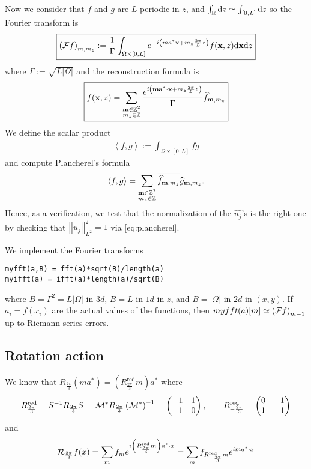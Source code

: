 \documentclass[11pt,a4paper,reqno,french,tikz]{amsart}
\def\d{{\rm d}}
\newcommand{\pa}[1]{\left( #1 \right)} %
\newcommand{\ab}[1]{\left|#1\right|} %
\newcommand{\ps}[1]{\left< #1 \right>} %
\newcommand{\nor}[2]{ \left| \! \left| #1 \right| \! \right|_{#2} } %
\newcommand{\f}[2]{\frac{#1}{#2}} %
\newcommand{\mat}[1]{\begin{pmatrix} #1 \end{pmatrix}} %
\def\ba{{\mathbf a}}
\def\bx{{\mathbf x}}
\def\bmm{{\mathbf m}}
\begin{document}
Now we consider that $f$ and $g$ are $L$-periodic in $z$, and $\int_\R \d z \simeq \int_{[0,L]} \d z$ so the Fourier transform is
\begin{align*}
	\boxed{\pa{\cF f}_{m,m_z} := \f{1}{\Gamma} \int_{\Omega\times [0,L]} e^{-i\pa{ma^* \bx + m_z \f{2\pi}{L} z}} f(\bx,z) \d \bx \d z}
\end{align*}
where $\Gamma := \sqrt{L\ab{\Omega}}$
and the reconstruction formula is
\begin{align}\label{eq:dec_four}
\boxed{f(\bx,z) =  \sum_{\substack{\bmm \in \Z^2 \\ m_z \in \Z}}  \f{e^{i\pa{\bmm \ba^* \cdot \bx + m_z \f{2\pi}L z}}}{\Gamma} \widehat{f}_{\bmm,m_z}}
\end{align}
We define the scalar product
\begin{align*}
\ps{f,g} := \int_{\Omega\times [0,L]} \overline{f}g
\end{align*}
and compute Plancherel's formula
\begin{align}\label{eq:plancherel}
\ps{f,g} = \sum_{\substack{\bmm \in \Z^2 \\ m_z \in \Z}} \overline{\widehat{f}_{\bmm,m_z}} \widehat{g}_{\bmm,m_z}.
\end{align}
Hence, as a verification, we test that the normalization of the $\widehat{u_j}$'s is the right one by checking that $\nor{u_j}{L^2}^2 = 1$ via \eqref{eq:plancherel}.

We implement the Fourier transforms
\begin{lstlisting}
myfft(a,B) = fft(a)*sqrt(B)/length(a)
myifft(a) = ifft(a)*length(a)/sqrt(B)
\end{lstlisting}
where $B = \Gamma^2 = L \ab{\Omega}$ in $3d$, $B = L$ in $1d$ in $z$, and $B=\ab{\Omega}$ in $2d$ in $(x,y)$. If $a_i = f(x_i)$ are the actual values of the functions, then $myfft(a)[m] \simeq \pa{\cF f}_{m-1}$ up to Riemann series errors.


\subsection{Rotation action}%
\label{sub:rotation_action}


We know that $R_{\f{2\pi}3} \pa{ma^* } = \pa{R_{\f{2\pi}3}^{\text{red}} m} a^*$ where
\begin{align*}
	R_{\f{2\pi}3}^{\text{red}} = S^{-1} R_{\f{2\pi}3} S =  \cM^* R_{\f{2\pi}3} \pa{\cM^*}^{-1} = \mat{-1 & 1 \\ -1 & 0}, \qquad R_{-\f{2\pi}3}^{\text{red}} = \mat{0 & -1 \\ 1 & -1}
\end{align*}
and
\begin{align*}
\cR_{\f{2\pi}3} f(x) = \sum_m f_m e^{i \pa{R_{\f{2\pi}3}^{\text{red}} m} a^* \cdot x} = \sum_m f_{R_{-\f{2\pi}3}^{\text{red}} m} e^{im a^* \cdot x}
\end{align*}
\end{document}
